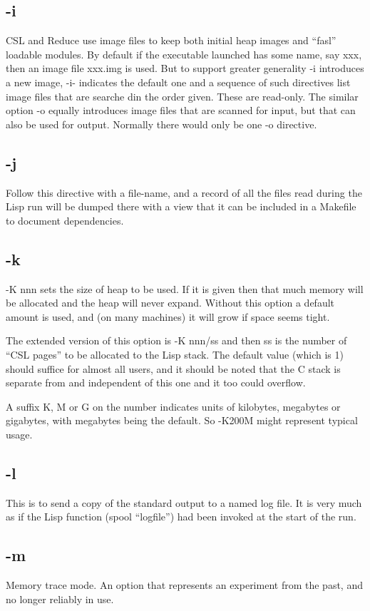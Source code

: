 \documentclass[a4paper,11pt]{article}
\begin{document}
\subsection{\ttfamily -i}
CSL and Reduce use image files to keep both initial heap images and
``fasl'' loadable modules. By default if the executable launched has some name,
say xxx, then an image file xxx.img is used. But to support greater
generality {\ttfamily -i} introduces a new image, {\ttfamily -i-} indicates
the default one and a sequence of such directives list image files that are
searche din the order given. These are read-only. The similar option
{\ttfamily -o} equally introduces image files that are scanned for input, but
that can also be used for output. Normally there would only be one
{\ttfamily -o} directive.
\subsection{\ttfamily -j}
Follow this directive with a file-name, and a record of all the files read
during the Lisp run will be dumped there with a view that it can be included
in a Makefile to document dependencies.
\subsection{\ttfamily -k}
{\ttfamily -K nnn} sets the size of heap to be used.  If it is given then that much
memory will be allocated and the heap will never expand.  Without this
option a default amount is used, and (on many machines) it will grow
if space seems tight.

The extended version of this option is {\ttfamily -K nnn/ss} and then ss is the
number of ``CSL pages'' to be allocated to the Lisp stack. The default
value (which is 1) should suffice for almost all users, and it should
be noted that the C stack is separate from and independent of this one and
it too could overflow.

A suffix K, M or G on the number indicates units of kilobytes, megabytes or
gigabytes, with megabytes being the default. So {\ttfamily -K200M} might
represent typical usage.
\subsection{\ttfamily -l}
This is to send a copy of the standard output to a named log file. It is
very much as if the Lisp function {\ttfamily (spool ``logfile'')} had been
invoked at the start of the run.
\subsection{\ttfamily -m}
Memory trace mode. An option that represents an experiment from the past,
and no longer reliably in use.
\end{document}
